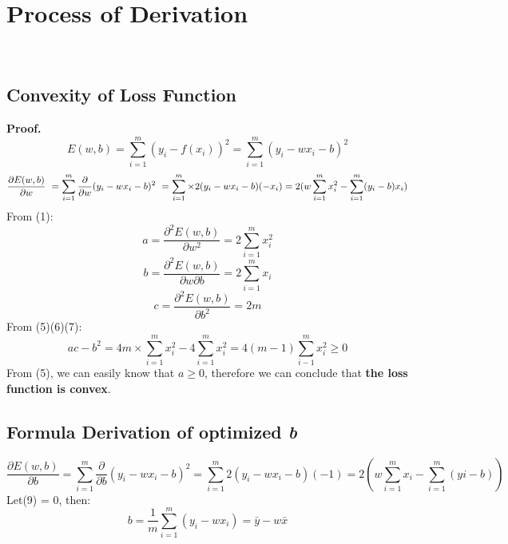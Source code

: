 \documentclass{article}
\begin{document}
\section{Process of Derivation} ~\cite{machinelearning}
\subsection{Convexity of Loss Function}
\textbf{Proof.}\newline 
\begin{equation}
E(w, b) = \sum_{i = 1}^m (y_i - f(x_i))^2 = \sum_{i = 1}^m (y_i - wx_i - b )^2
\end{equation}
\begin{equation}
\frac{\partial E(w, b) }{\partial w}\ = \sum_{i = 1}^m \frac{\partial}{\partial w}  (y_i - wx_i - b)^2 \newline\ = \sum_{i = 1}^m \times 2 (y_i - wx_i - b)(-x_i) = 2(w \sum_{i = 1}^m x_i^2 - \sum_{i = 1}^m (y_i - b)x_i)
\end{equation}
From (1): \newline
\begin{equation}
a = \frac{\partial^2 E(w, b) }{\partial w^2} = 2 \sum_{i = 1}^m x_i^2 
\end{equation}
\begin{equation}
b = \frac{\partial^2 E(w, b) }{\partial w \partial b} = 2 \sum_{i = 1}^m x_i 
\end{equation}
\begin{equation}
c = \frac{\partial^2 E(w, b) }{\partial b^2} = 2m
\end{equation}
From (5)(6)(7):
\begin{equation}
ac - b^2 = 4m\times \sum_{i = 1}^m x_i^2 - 4\sum_{i = 1}^m x_i^2
= 4(m-1) \sum_{i-1}^m x_i^2 \ge 0 
\end{equation}
From (5), we can easily know that $ \textit{a} \ge 0 $, therefore we can conclude that \textbf{the loss function is convex}.
\subsection{Formula Derivation of optimized \textit{b}}
\begin{equation}
\frac{\partial E(w, b)}{\partial b} =\sum_{i=1}^m \frac{\partial}{\partial b} (y_i-wx_i-b)^2 = \sum_{i=1}^m 2(y_i-wx_i-b)(-1) = 2(w\sum_{i = 1}^m x_i - \sum_{i = 1}^m (yi-b))
\end{equation}
Let(9) = 0, then:
\begin{equation}
b = \frac{1}{m}\sum_{i=1}^m (y_i - wx_i) = \bar{y}-w\bar{x}
\end{equation}
\end{document}
